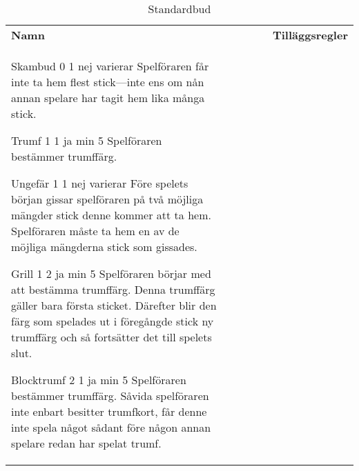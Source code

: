 %
%
%
%

\begin{table}
	\caption{Standardbud}\label{tab:standardBids}
	\begin{center}
		\begin{tabularx}{\textwidth}{
			l
			S[table-number-alignment=center, table-format=1.0]
			S[table-number-alignment=center, table-format=1.0]
			cc|X
		}
				\textbf{Namn} &
				 &
				 &
				 &
				 &
				\textbf{Tilläggsregler}
				\\[-3ex]

				\standardBidItem%
				{Skambud}
				{0}
				{1}
				{nej}
				{varierar}
				{%
					Spelföraren får inte ta hem flest stick---inte ens om nån annan spelare har tagit hem lika många stick.
				}

				\standardBidItem%
				{Trumf}
				{1}
				{1}
				{ja}
				{min 5}
				{%
					Spelföraren bestämmer trumffärg.
				}

				\standardBidItem%
				{Ungefär}
				{1}
				{1}
				{nej}
				{varierar}
				{%
					Före spelets början gissar spelföraren på två möjliga mängder stick denne kommer att ta hem. Spelföraren måste ta hem en av de möjliga mängderna stick som gissades.
				}

				\standardBidItem%
				{Grill}
				{1}
				{2}
				{ja}
				{min 5}
				{%
					Spelföraren börjar med att bestämma trumffärg. Denna trumffärg gäller bara första sticket. Därefter blir den färg som spelades ut i föregångde stick ny trumffärg och så fortsätter det till spelets slut.
				}

				\standardBidItem%
				{Blocktrumf}
				{2}
				{1}
				{ja}
				{min 5}
				{%
					Spelföraren bestämmer trumffärg. Såvida spelföraren inte enbart besitter trumfkort, får denne inte spela något sådant före någon annan spelare redan har spelat trumf.
				}
				

\end{tabularx}
\end{center}
\end{table}
